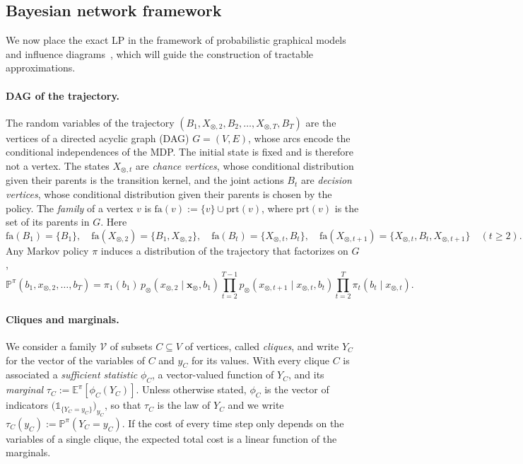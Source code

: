 \documentclass{article}
\begin{document}
\subsection{Bayesian network framework}
\label{sec:dag}
\label{sec:marginal-polytopes}

We now place the exact LP in the framework of probabilistic graphical models and influence
diagrams~\cite{wainwright2008graphical, parmentier2019integer}, which will guide the construction of tractable
approximations.

\paragraph{DAG of the trajectory.}
The random variables of the trajectory $(B_1,X_{\otimes,2},B_2,\ldots,X_{\otimes,T},B_T)$ are the vertices of a directed
acyclic graph (DAG) $G = (V, E)$, whose arcs encode the conditional independences of the MDP. The initial state is
fixed and is therefore not a vertex. The states $X_{\otimes,t}$ are \emph{chance vertices}, whose conditional
distribution given their parents is the transition kernel, and the joint actions $B_t$ are \emph{decision vertices},
whose conditional distribution given their parents is chosen by the policy. The \emph{family} of a vertex $v$ is
$\mathrm{fa}(v) := \{v\} \cup \mathrm{prt}(v)$, where $\mathrm{prt}(v)$ is the set of its parents in $G$. Here
\[
  \mathrm{fa}(B_1) = \{B_1\}, \quad
  \mathrm{fa}(X_{\otimes,2}) = \{B_1, X_{\otimes,2}\}, \quad
  \mathrm{fa}(B_t) = \{X_{\otimes,t}, B_t\}, \quad
  \mathrm{fa}(X_{\otimes,t+1}) = \{X_{\otimes,t}, B_t, X_{\otimes,t+1}\} \quad (t \ge 2).
\]
Any Markov policy $\pi$ induces a distribution of the trajectory that factorizes on $G$,
\[
  \mathbb{P}^\pi(b_1, x_{\otimes,2}, \ldots, b_T) = \pi_1(b_1)\, p_\otimes(x_{\otimes,2} \mid \mathbf{x}_\otimes, b_1)
    \prod_{t=2}^{T-1} p_\otimes(x_{\otimes,t+1} \mid x_{\otimes,t}, b_t) \prod_{t=2}^{T} \pi_t(b_t \mid x_{\otimes,t}).
\]

\paragraph{Cliques and marginals.}
We consider a family $\mathcal{V}$ of subsets $C \subseteq V$ of vertices, called \emph{cliques}, and write $Y_C$ for
the vector of the variables of $C$ and $y_C$ for its values. With every clique $C$ is associated a \emph{sufficient
statistic} $\phi_C$, a vector-valued function of $Y_C$, and its \emph{marginal} $\tau_C := \mathbb{E}^\pi[\phi_C(Y_C)]$.
Unless otherwise stated, $\phi_C$ is the vector of indicators $\big(\mathds{1}_{\{Y_C = y_C\}}\big)_{y_C}$, so that
$\tau_C$ is the law of $Y_C$ and we write $\tau_C(y_C) := \mathbb{P}^\pi(Y_C = y_C)$. If the cost of every time step
only depends on the variables of a single clique, the expected total cost is a linear function of the marginals.
\end{document}
